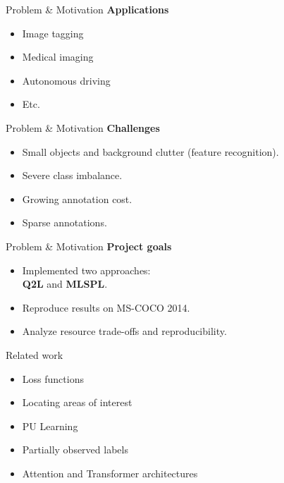 \begin{frame}{Problem \& Motivation}
    \textbf{Applications}
  \begin{itemize}
    \item Image tagging 
    \item Medical imaging
    \item Autonomous driving
    \item Etc.
  \end{itemize}
\end{frame}

\begin{frame}{Problem \& Motivation}
  \textbf{Challenges}  
      \begin{itemize}
        \item Small objects and background clutter (feature recognition).
        \item Severe class imbalance.
        \item Growing annotation cost.
        \item Sparse annotations.
      \end{itemize}
\end{frame}


\begin{frame}{Problem \& Motivation}
    \textbf{Project goals}
  \begin{itemize}
    \item Implemented two approaches: \\ \textbf{Q2L} and \textbf{MLSPL}.
    \item Reproduce results on MS-COCO 2014.
    \item Analyze resource trade-offs and reproducibility.
  \end{itemize}
\end{frame}


\begin{frame}{Related work}
  \begin{itemize}
    \item Loss functions
    \item Locating areas of interest
    \item PU Learning
    \item Partially observed labels
    \item Attention and Transformer architectures
  \end{itemize}
\end{frame}